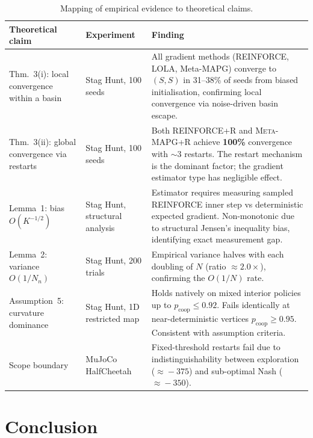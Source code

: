 \documentclass[11pt,a4paper]{article}
\newcommand{\OUR}{\textsc{Meta-MAPG+R}}
\theoremstyle{remark}
\begin{document}
\begin{table}[H]
  \centering
  \caption{%
    Mapping of empirical evidence to theoretical claims.
  }
  \label{tab:mapping}
  \setlength{\tabcolsep}{5pt}
  \begin{tabular}{>{\small}p{3.3cm} >{\small}p{3.8cm} >{\small}p{5.8cm}}
    \toprule
    \textbf{Theoretical claim} & \textbf{Experiment} & \textbf{Finding} \\
    \midrule
    Thm.~3(i): local convergence within a basin &
    Stag Hunt, 100 seeds &
    All gradient methods (REINFORCE, LOLA, Meta-MAPG) converge to
    $(S,S)$ in 31--38\% of seeds from biased initialisation,
    confirming local convergence via noise-driven basin escape. \\[4pt]
    Thm.~3(ii): global convergence via restarts &
    Stag Hunt, 100 seeds &
    Both REINFORCE+R and \OUR{} achieve \textbf{100\%}
    convergence with $\sim$3 restarts.
    The restart mechanism is the dominant factor;
    the gradient estimator type has negligible effect. \\[4pt]
    Lemma~1: bias $O(K^{-1/2})$ &
    Stag Hunt, structural analysis &
    Estimator requires measuring sampled REINFORCE inner step vs deterministic expected gradient. Non-monotonic due to structural Jensen's inequality bias, identifying exact measurement gap. \\[4pt]
    Lemma~2: variance $O(1/N_n)$ &
    Stag Hunt, 200 trials &
    Empirical variance halves with each doubling of $N$
    (ratio $\approx 2.0\times$), confirming the $O(1/N)$ rate. \\[4pt]
    Assumption~5: curvature dominance &
    Stag Hunt, 1D restricted map &
    Holds natively on mixed interior policies up to $p_{\mathrm{coop}} \le 0.92$.
    Fails identically at near-deterministic vertices $p_{\mathrm{coop}} \ge 0.95$.
    Consistent with assumption criteria. \\[4pt]
    Scope boundary &
    MuJoCo HalfCheetah &
    Fixed-threshold restarts fail due to indistinguishability
    between exploration ($\approx\!-375$) and sub-optimal Nash ($\approx\!-350$). \\
    \bottomrule
  \end{tabular}
\end{table}

\section{Conclusion}
\label{sec:conclusion}
\end{document}
